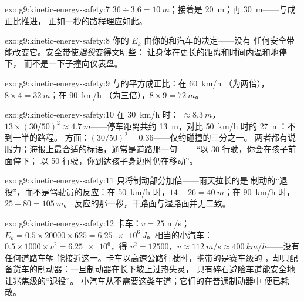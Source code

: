 \begin{solution}{exo:g9:kinetic-energy-safety:7}
$36 \div 3.6 = \qty{10}{m}$；接着是 \qty{20}{m}；再
\qty{30}{m}——与成正比推进，
正如一秒的路程理应如此。
\end{solution}

\begin{solution}{exo:g9:kinetic-energy-safety:8}
你的 $E_k$ 由你的和汽车的决定——没有
任何安全带能改变它。安全带使\emph{退役}变得文明些：
让身体在更长的距离和时间内温和地停下，
而不是一下子撞向仪表盘。
\end{solution}

\begin{solution}{exo:g9:kinetic-energy-safety:9}
与的平方成正比：在 \qty{60}{km/h}
（为两倍），$8 \times 4 = \qty{32}{m}$；在 \qty{90}{km/h}
（为三倍），$8 \times 9 = \qty{72}{m}$。
\end{solution}

\begin{solution}{exo:g9:kinetic-energy-safety:10}
在 \qty{30}{km/h} 时： $\approx \qty{8.3}{m}$， $13 \times (30/50)^2 \approx \qty{4.7}{m}$——停车距离共约
\qty{13}{m}，对比 \qty{50}{km/h} 时的 \qty{27}{m}：不到一半的路程。
方面：$(30/50)^2 = 0.36$——仅约碰撞的三分之一。
两者都有说服力；海报上最合适的标语，通常是道路那一句——
“以 30 行驶，你会在孩子前面停下；
以 50 行驶，你到达孩子身边时仍在移动”。
\end{solution}

\begin{solution}{exo:g9:kinetic-energy-safety:11}
只将制动部分加倍——雨天拉长的是
制动的“退役”，而不是驾驶员的反应：在 \qty{50}{km/h} 时，$14 + 26 =
\qty{40}{m}$；在 \qty{90}{km/h} 时，$25 + 80 = \qty{105}{m}$。
反应的那一秒，干路面与湿路面并无二致。
\end{solution}

\begin{solution}{exo:g9:kinetic-energy-safety:12}
卡车：$v = 25$ \unit{m/s}；$E_k = 0.5 \times 20000 \times
625 = \qty{6.25e6}{J}$。相当的小汽车：$0.5 \times 1000 \times
v^2 = \num{6.25e6}$，得 $v^2 = 12500$，$v \approx
\qty{112}{m/s} \approx \qty{400}{km/h}$——没有任何道路车辆
能接近这一。卡车以高速公路行驶时，携带的是赛车级的
，却只配备货车的制动器：一旦制动器在长下坡上过热失灵，
只有碎石避险车道能安全地让兆焦级的“退役”。
小汽车从不需要这类车道；它们的在普通制动器中
便已耗散。
\end{solution}

